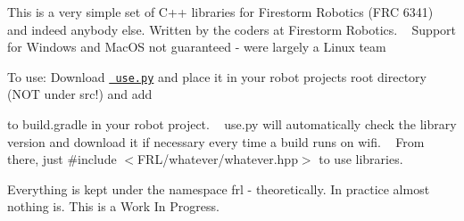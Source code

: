 This is a very simple set of C++ libraries for Firestorm Robotics (FRC 6341) and indeed anybody else. Written by the coders at Firestorm Robotics. ~\newline
 Support for Windows and Mac\+OS not guaranteed -\/ we\textquotesingle{}re largely a Linux team

To use\+: Download \href{https://firestorm-robotics-code.github.io/FirestormRoboticsLibrary/use.py}{\texttt{ use.\+py}} and place it in your robot project\textquotesingle{}s root directory (NOT under src!) and add 
\begin{DoxyCode}{0}
\DoxyCodeLine{\}}
\DoxyCodeLine{}

\end{DoxyCode}
 to {\ttfamily build.\+gradle} in your robot project. ~\newline
 {\ttfamily use.\+py} will automatically check the library version and download it if necessary every time a build runs on wifi. ~\newline
 From there, just {\ttfamily \#include \texorpdfstring{$<$}{<}FRL/whatever/whatever.\+hpp\texorpdfstring{$>$}{>}} to use libraries.

Everything is kept under the namespace {\ttfamily frl} -\/ theoretically. In practice almost nothing is. This is a Work In Progress. 